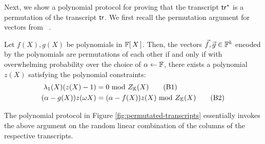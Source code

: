 Next, we show a polynomial protocol for proving that the transcript $\mathsf{tr}^\ast$ is a permutation of the transcript $\mathsf{tr}$.
We first recall the permutation argument for vectors from ~\cite{EPRINT:GabWilCio19}.
\begin{lemma}\label{lem:perm-argument}
Let $f(X), g(X)$ be polynomials in $\mathbb{F}[\,X\,]$. Then, the vectors $\vec{f}, \vec{g}\in \mathbb{F}^k$ encoded by the polynomials
are permutations of each other if and only if with overwhelming probability over the choice of $\alpha\gets \mathbb{F}$,
there exists a polynomial $z(X)$ satisfying the polynomial constraints:
    {\small
\begin{align}
    \lambda_1(X)(z(X) -1) &= 0 \text{ mod } Z_{\mathbb{K}}(X) \tag{B1} \label{eq:B1} \\
    (\alpha - g(X))z(\omega X) &= (\alpha - f(X))z(X) \text{ mod } Z_{\mathbb{K}}(X) \tag{B2} \label{eq:B2}
\end{align}
}
\end{lemma}
The polynomial protocol in Figure \ref{fig:permutated-transcripts} essentially invokes the above argument on
the random linear combination of the columns of the respective transcripts.
